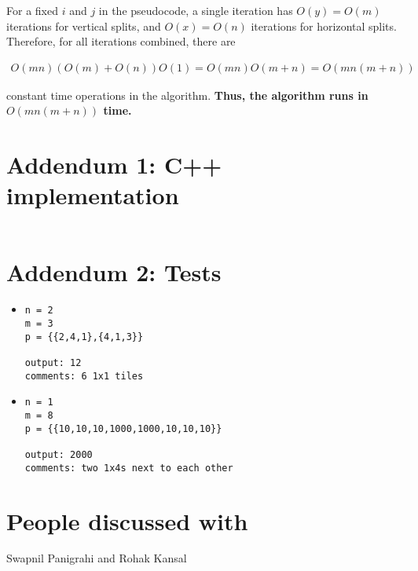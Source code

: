 \documentclass{article}
\begin{document}
For a fixed $i$ and $j$ in the pseudocode, a single iteration has $O(y) = O(m)$ iterations for vertical splits, and $O(x) = O(n)$ iterations for horizontal splits. Therefore, for all iterations combined, there are 

\begin{align*}
    O(mn)(O(m) + O(n))O(1) = O(mn)O(m + n) = O(mn(m+n))
\end{align*}

constant time operations in the algorithm. \textbf{Thus, the algorithm runs in $O(mn(m+n))$ time.}

\section{Addendum 1: C++ implementation}
\inputminted{cpp}{/home/rachit/prog/a.cpp}

\section{Addendum 2: Tests}
\begin{itemize}

\item
\begin{verbatim}
n = 2
m = 3
p = {{2,4,1},{4,1,3}}

output: 12
comments: 6 1x1 tiles
\end{verbatim}


\item
\begin{verbatim}
n = 1
m = 8
p = {{10,10,10,1000,1000,10,10,10}}

output: 2000
comments: two 1x4s next to each other
\end{verbatim}

\end{itemize}
\section{People discussed with}
Swapnil Panigrahi and Rohak Kansal
\end{document}
